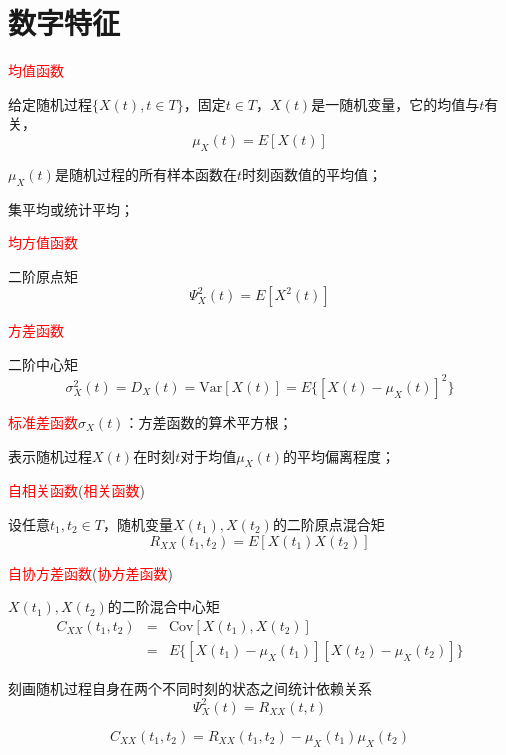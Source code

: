 \documentclass[12pt,a4paper]{article}
\begin{document}
\section{数字特征}

\textcolor{red}{均值函数}

给定随机过程$\{X(t), t\in T\}$，固定$t\in T$，$X(t)$是一随机变量，它的均值与$t$有关，
\begin{equation}
\mu_X (t)=E[X(t)]
\end{equation}

$\mu_X (t)$是随机过程的所有样本函数在$t$时刻函数值的平均值；

集平均或统计平均；

\textcolor{red}{均方值函数}

二阶原点矩
\begin{equation}
\Psi_X^2 (t)=E[X^2 (t)]
\end{equation}

\textcolor{red}{方差函数}

二阶中心矩
\begin{equation}
\sigma_X^2 (t)=D_X (t) = \text{Var}[X(t)] = E\{[X(t)-\mu_X (t)]^2 \}
\end{equation}

\textcolor{red}{标准差函数}$\sigma_X (t)$：方差函数的算术平方根；

表示随机过程$X(t)$在时刻$t$对于均值$\mu_X (t)$的平均偏离程度；

\textcolor{red}{自相关函数}(\textcolor{red}{相关函数})

设任意$t_1, t_2\in T$，随机变量$X(t_1), X(t_2)$的二阶原点混合矩
\begin{equation}
R_{XX} (t_1, t_2 )=E[X(t_1) X(t_2)]
\end{equation}


\textcolor{red}{自协方差函数}(\textcolor{red}{协方差函数})

$X(t_1), X(t_2)$的二阶混合中心矩
\begin{eqnarray}
\nonumber C_{XX} (t_1,t_2 ) &=& \text{Cov}[X(t_1), X(t_2)] \\
&=& E\{[X(t_1) - \mu_X (t_1)][X(t_2) - \mu_X (t_2)]\}
\end{eqnarray}

刻画随机过程自身在两个不同时刻的状态之间统计依赖关系
\begin{equation}
\Psi_X^2 (t)=R_{XX}(t, t)
\end{equation}

\begin{equation}
C_{XX} (t_1, t_2 ) = R_{XX}(t_1, t_2 ) - \mu_X(t_1) \mu_X (t_2)
\end{equation}
\end{document}
